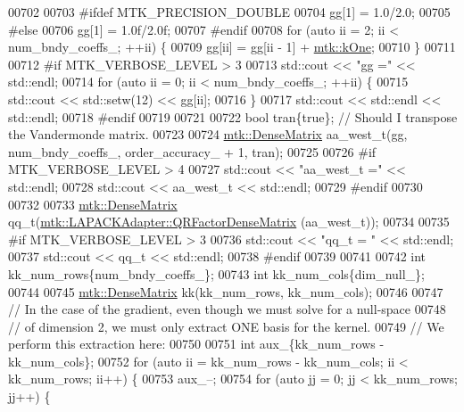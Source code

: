 \begin{DoxyCode}
{{00702 
00703 \textcolor{preprocessor}{  #ifdef MTK\_PRECISION\_DOUBLE}
00704   gg[1] = 1.0/2.0;
00705 \textcolor{preprocessor}{  #else}
00706   gg[1] = 1.0f/2.0f;
00707 \textcolor{preprocessor}{  #endif}
00708   \textcolor{keywordflow}{for} (\textcolor{keyword}{auto} ii = 2; ii < num\_bndy\_coeffs\_; ++ii) \{
00709     gg[ii] = gg[ii - 1] + \hyperlink{group__c01-roots_ga26407c24d43b6b95480943340d285c71}{mtk::kOne};
00710   \}
00711 
00712 \textcolor{preprocessor}{  #if MTK\_VERBOSE\_LEVEL > 3}
00713   std::cout << \textcolor{stringliteral}{"gg ="} << std::endl;
00714   \textcolor{keywordflow}{for} (\textcolor{keyword}{auto} ii = 0; ii < num\_bndy\_coeffs\_; ++ii) \{
00715     std::cout << std::setw(12) << gg[ii];
00716   \}
00717   std::cout << std::endl << std::endl;
00718 \textcolor{preprocessor}{  #endif}
00719 
00721 
00722   \textcolor{keywordtype}{bool} tran\{\textcolor{keyword}{true}\}; \textcolor{comment}{// Should I transpose the Vandermonde matrix.}
00723 
00724   \hyperlink{classmtk_1_1DenseMatrix}{mtk::DenseMatrix} aa\_west\_t(gg, num\_bndy\_coeffs\_, order\_accuracy\_ + 1, tran);
00725 
00726 \textcolor{preprocessor}{  #if MTK\_VERBOSE\_LEVEL > 4}
00727   std::cout << \textcolor{stringliteral}{"aa\_west\_t ="} << std::endl;
00728   std::cout << aa\_west\_t << std::endl;
00729 \textcolor{preprocessor}{  #endif}
00730 
00732 
00733   \hyperlink{classmtk_1_1DenseMatrix}{mtk::DenseMatrix} qq\_t(\hyperlink{classmtk_1_1LAPACKAdapter_ae5c6e78c9c819c9ac7a6f31bfd011d7a}{mtk::LAPACKAdapter::QRFactorDenseMatrix}
      (aa\_west\_t));
00734 
00735 \textcolor{preprocessor}{  #if MTK\_VERBOSE\_LEVEL > 3}
00736   std::cout << \textcolor{stringliteral}{"qq\_t = "} << std::endl;
00737   std::cout << qq\_t << std::endl;
00738 \textcolor{preprocessor}{  #endif}
00739 
00741 
00742   \textcolor{keywordtype}{int} kk\_num\_rows\{num\_bndy\_coeffs\_\};
00743   \textcolor{keywordtype}{int} kk\_num\_cols\{dim\_null\_\};
00744 
00745   \hyperlink{classmtk_1_1DenseMatrix}{mtk::DenseMatrix} kk(kk\_num\_rows, kk\_num\_cols);
00746 
00747   \textcolor{comment}{// In the case of the gradient, even though we must solve for a null-space}
00748   \textcolor{comment}{// of dimension 2, we must only extract ONE basis for the kernel.}
00749   \textcolor{comment}{// We perform this extraction here:}
00750 
00751   \textcolor{keywordtype}{int} aux\_\{kk\_num\_rows - kk\_num\_cols\};
00752   \textcolor{keywordflow}{for} (\textcolor{keyword}{auto} ii = kk\_num\_rows - kk\_num\_cols; ii < kk\_num\_rows; ii++) \{
00753     aux\_--;
00754     \textcolor{keywordflow}{for} (\textcolor{keyword}{auto} jj = 0; jj < kk\_num\_rows; jj++) \{
}}
\end{DoxyCode}
